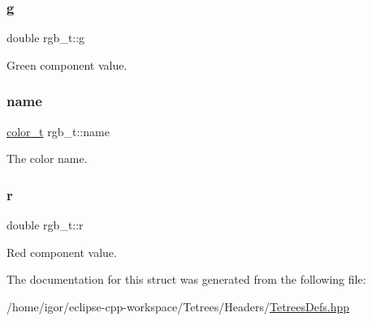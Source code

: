 \subsubsection{\texorpdfstring{g}{g}}
{\footnotesize\ttfamily double rgb\+\_\+t\+::g}

Green component value. \mbox{\label{structrgb__t_a98fbae1e6897105536340238b9660ba5}} 
\subsubsection{\texorpdfstring{name}{name}}
{\footnotesize\ttfamily \hyperlink{TetreesDefs_8hpp_a8ba5fbce2446135735693ab60c896bbd}{color\+\_\+t} rgb\+\_\+t\+::name}

The color name. \mbox{\label{structrgb__t_a89e46e1937cafe0683023100a5e1915a}} 
\subsubsection{\texorpdfstring{r}{r}}
{\footnotesize\ttfamily double rgb\+\_\+t\+::r}

Red component value. 

The documentation for this struct was generated from the following file\+:\begin{DoxyCompactItemize}
\item 
/home/igor/eclipse-\/cpp-\/workspace/\+Tetrees/\+Headers/\hyperlink{TetreesDefs_8hpp}{Tetrees\+Defs.\+hpp}\end{DoxyCompactItemize}
